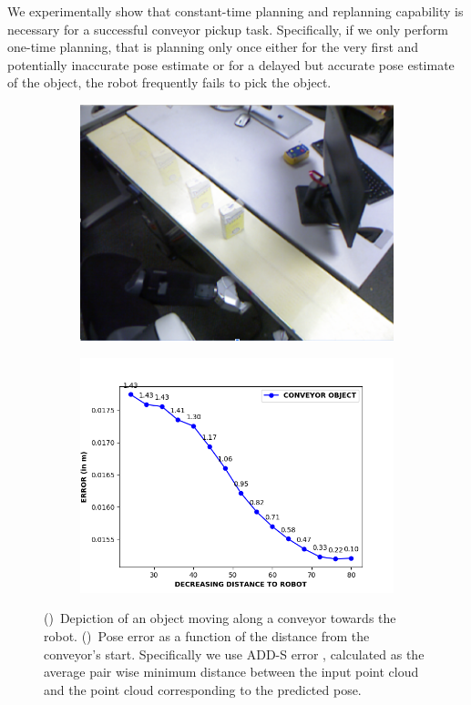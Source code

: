 \documentclass[a4paper]{report}
\begin{document}
%
We experimentally show that constant-time planning and replanning capability is necessary for a successful conveyor pickup task. Specifically, if we only perform one-time planning, that is planning only once either for the very first and potentially inaccurate pose estimate or for a delayed but accurate pose estimate of the object, the robot frequently fails to pick the object.
\begin{figure}[t]
    \centering
    \begin{subfigure}{.49\textwidth}
         \includegraphics[width=\textwidth]{object_blur}
        \caption{}
        \label{fig:obj1}
    \end{subfigure}
    \begin{subfigure}{0.49\textwidth}
         \includegraphics[width=\textwidth]{pose_error_plot}
        \caption{}
        \label{fig:obj2}
    \end{subfigure}
    \caption{
    \CaptionTextSize
    ()~Depiction of an object moving along a conveyor towards the robot.
    ()~Pose error as a function of the distance from the conveyor's start. Specifically we use ADD-S error \cite{add_metric},
    calculated as the average pair wise minimum distance between the input point cloud and the point cloud corresponding to the predicted pose.
    }
    \label{fig:pose_sequence}
\end{figure}
\end{document}
